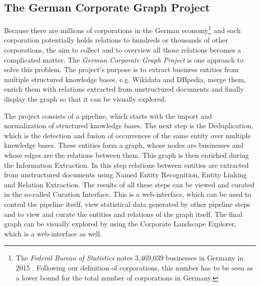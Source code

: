 \subsection*{The German Corporate Graph Project}
Because there are millions of corporations in the German economy\footnote{ The \emph{Federal Bureau of Statistics} notes 3,469,039 businesses in Germany in 2015 \cite{destatis1}. Following our definition of corporations, this number has to be seen as a lower bound for the total number of corporations in Germany.} and each corporation potentially holds relations to hundreds or thousands of other corporations, the aim to collect and to overview all those relations becomes a complicated matter. The \emph{German Corporate Graph Project} is one approach to solve this problem. The project's purpose is to extract business entities from multiple structured knowledge bases, e.g. Wikidata and DBpedia, merge them, enrich them with relations extracted from unstructured documents and finally display the graph so that it can be visually explored.\par
The project consists of a pipeline, which starts with the import and normalization of structured knowledge bases. The next step is the Deduplication, which is the detection and fusion of occurrences of the same entity over multiple knowledge bases. These entities form a graph, whose nodes are businesses and whose edges are the relations between them. This graph is then enriched during the Information Extraction. In this step relations between entities are extracted from unstructured documents using Named Entity Recognition, Entity Linking and Relation Extraction. The results of all these steps can be viewed and curated in the so-called Curation Interface. This is a web-interface, which can be used to control the pipeline itself, view statistical data generated by other pipeline steps and to view and curate the entities and relations of the graph itself. The final graph can be visually explored by using the Corporate Landscape Explorer, which is a web-interface as well.\par

